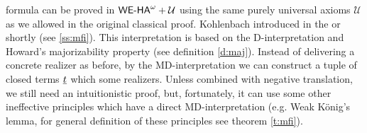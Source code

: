 formula can be proved in ${\textsf{\upshape WE-HA}}^{\omega}+\mathcal{U}$ using the same purely universal
axioms $\mathcal{U}$ as we allowed in the original classical proof. 
%
%
Kohlenbach introduced in \cite{Kohlenbach96mfi}
the  or shortly  
(see \ref{ss:mfi}). 
This interpretation is based on the D-interpretation and Howard's majorizability 
property (see definition \ref{d:maj}). 
Instead of delivering a concrete realizer as before, by the MD-interpretation 
we can construct a tuple of closed terms $\underline t$ which  
some realizers. Unless combined with negative translation, we still need an 
intuitionistic proof, but, fortunately,
it can use some other ineffective principles which have
a direct MD-interpretation (e.g. Weak K\"onig's lemma, for general 
definition of these principles see theorem \ref{t:mfi}).\\

